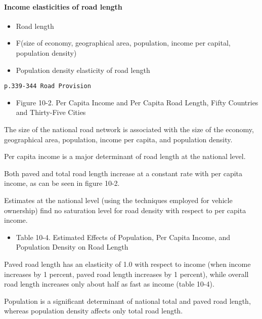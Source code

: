 \documentclass[]{article}
\providecommand{\tightlist}{%
  \setlength{\itemsep}{0pt}\setlength{\parskip}{0pt}}
\let\oldparagraph\paragraph
\renewcommand{\paragraph}[1]{\oldparagraph{#1}\mbox{}}
\begin{document}
\hypertarget{income-elasticities-of-road-length}{%
\paragraph{Income elasticities of road
length}\label{income-elasticities-of-road-length}}

\begin{itemize}
\tightlist
\item
  Road length
\item
  F(size of economy, geographical area, population, income per capital,
  population density)
\item
  Population density elasticity of road length
\end{itemize}

\texttt{p.339-344\ Road\ Provision}

\begin{itemize}
\tightlist
\item
  Figure 10-2. Per Capita Income and Per Capita Road Length, Fifty
  Countries and Thirty-Five Cities
\end{itemize}

The size of the national road network is associated with the size of the
economy, geographical area, population, income per capita, and
population density.

Per capita income is a major determinant of road length at the national
level.

Both paved and total road length increase at a constant rate with per
capita income, as can be seen in figure 10-2.

Estimates at the national level (using the techniques employed for
vehicle ownership) find no saturation level for road density with
respect to per capita income.

\begin{itemize}
\tightlist
\item
  Table 10-4. Estimated Effects of Population, Per Capita Income, and
  Population Density on Road Length
\end{itemize}

Paved road length has an elasticity of 1.0 with respect to income (when
income increases by 1 percent, paved road length increases by 1
percent), while overall road length increases only about half as fast as
income (table 10-4).

Population is a significant determinant of national total and paved road
length, whereas population density affects only total road length.
\end{document}
